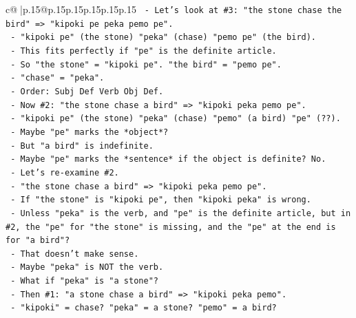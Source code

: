 \documentclass{article}
\begin{document}
{\begin{supertabular}{c@{$\;$}|p{.15\linewidth}@{}p{.15\linewidth}p{.15\linewidth}p{.15\linewidth}p{.15\linewidth}p{.15\linewidth}}
{{{\texttt{                    {-} Let's look at \#3: "the stone chase the bird" => "kipoki pe peka pemo pe".} \\
\texttt{                      {-} "kipoki pe" (the stone) "peka" (chase) "pemo pe" (the bird).} \\
\texttt{                      {-} This fits perfectly if "pe" is the definite article.} \\
\texttt{                      {-} So "the stone" = "kipoki pe". "the bird" = "pemo pe".} \\
\texttt{                      {-} "chase" = "peka".} \\
\texttt{                      {-} Order: Subj Def Verb Obj Def.} \\
\texttt{                      {-} Now \#2: "the stone chase a bird" => "kipoki peka pemo pe".} \\
\texttt{                        {-} "kipoki pe" (the stone) "peka" (chase) "pemo" (a bird) "pe" (??).} \\
\texttt{                        {-} Maybe "pe" marks the *object*?} \\
\texttt{                        {-} But "a bird" is indefinite.} \\
\texttt{                        {-} Maybe "pe" marks the *sentence* if the object is definite? No.} \\
\texttt{                        {-} Let's re{-}examine \#2.} \\
\texttt{                        {-} "the stone chase a bird" => "kipoki peka pemo pe".} \\
\texttt{                        {-} If "the stone" is "kipoki pe", then "kipoki peka" is wrong.} \\
\texttt{                        {-} Unless "peka" is the verb, and "pe" is the definite article, but in \#2, the "pe" for "the stone" is missing, and the "pe" at the end is for "a bird"?} \\
\texttt{                        {-} That doesn't make sense.} \\
\texttt{                        {-} Maybe "peka" is NOT the verb.} \\
\texttt{                        {-} What if "peka" is "a stone"?} \\
\texttt{                        {-} Then \#1: "a stone chase a bird" => "kipoki peka pemo".} \\
\texttt{                          {-} "kipoki" = chase? "peka" = a stone? "pemo" = a bird?} \\
}}}
\end{supertabular}}
\end{document}
